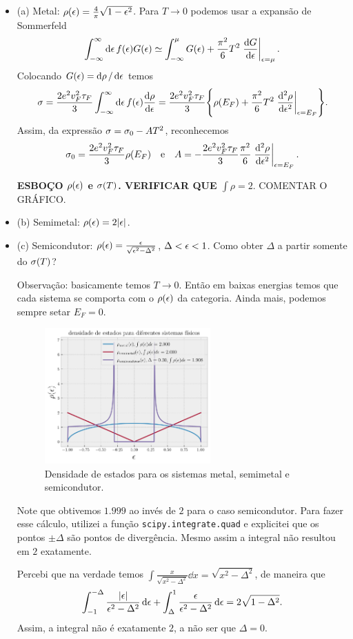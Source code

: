 \documentclass[a4paper,10pt]{article}
\begin{document}
\begin{itemize}
\item (a) Metal: $\rho(\epsilon) = \frac{4}{\pi} \sqrt{1-\epsilon^2}$. Para $T \to 0$ podemos usar a expansão de Sommerfeld
$$
\int_{-\infty}^{\infty} \dd{\eps} f(\eps) G(\eps) \simeq
\int_{-\infty}^{\mu} G(\eps) + \frac{\pi^2}{6} T^2 \eval{\dv{G}{\eps}}_{\eps=\mu}.
$$
Colocando $G(\epsilon) = \dd{\rho}/\dd{\epsilon}$ temos
$$
\s = \frac{2e^2 v_F^2 \tau_F}{3}
\int_{-\infty}^{\infty} \dd{\eps} f(\eps) \dv{\rho}{\eps} =
\frac{2e^2 v_F^2 \tau_F}{3}
\qty{\rho(E_F) + \frac{\pi^2}{6} T^2 \eval{\dv[2]{\rho}{\eps}}_{\eps=E_F}}.
$$
Assim, da expressão $\sigma = \sigma_0 - A T^2$, reconhecemos
$$
\s_0 = \frac{2e^2 v_F^2 \tau_F}{3} \rho(E_F) \e
A = -\frac{2e^2v_F^2\tau_F}{3} \frac{\pi^2}{6} \eval{\dv[2]{\rho}{\eps}}_{\eps=E_F}.
$$

\textbf{ESBOÇO $\rho(\epsilon)$ e $\sigma(T)$. VERIFICAR QUE $\int\rho=2$}. COMENTAR O GRÁFICO.

\item (b) Semimetal: $\rho(\epsilon)=2\abs{\epsilon}$.

\item (c) Semicondutor: $\rho(\epsilon) = \frac{\epsilon}{\sqrt{\epsilon^2-\Delta^2}}$, $\Delta < \epsilon < 1$. Como obter $\Delta$ a partir somente do $\sigma(T)$?

Observação: basicamente temos $T \to 0$. Então em baixas energias temos que cada sistema se comporta com o $\rho(\epsilon)$ da categoria. Ainda mais, podemos sempre setar $E_F = 0$.

\begin{figure}[H]
\centering
\includegraphics[width=0.6\textwidth]{fig/dos-systems.png}
\caption{Densidade de estados para os sistemas metal, semimetal e semicondutor.}
\label{fig:dos-systems}
\end{figure}
Note que obtivemos $1.999$ ao invés de $2$ para o caso semicondutor. Para fazer esse cálculo, utilizei a função \texttt{scipy.integrate.quad} e explicitei que os pontos $\pm\Delta$ são pontos de divergência. Mesmo assim a integral não resultou em $2$ exatamente.

Percebi que na verdade temos $\int \frac{x}{\sqrt{x^2-\Delta^2}} \dd{x} = \sqrt{x^2 - \Delta^2}$, de maneira que
$$
\int_{-1}^{-\Delta} \frac{\abs{\epsilon}}{\epsilon^2-\Delta^2} \dd{\epsilon} + \int_{\Delta}^{1} \frac{\epsilon}{\epsilon^2-\Delta^2} \dd{\epsilon} = 2 \sqrt{1-\Delta^2}.
$$
Assim, a integral não é exatamente $2$, a não ser que $\Delta = 0$.

\end{itemize}
\end{document}

